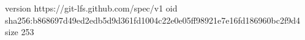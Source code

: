 version https://git-lfs.github.com/spec/v1
oid sha256:b868697d49ed2edb5d9d361fd1004c22e0e05ff98921e7e16fd186960bc2f9d4
size 253
